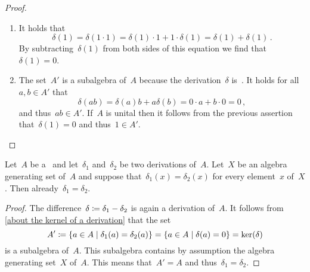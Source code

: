 \begin{proof}
  \leavevmode
  \begin{enumerate}
    \item
      It holds that
      \[
        \delta(1)
        =
        \delta(1 \cdot 1)
        =
        \delta(1) \cdot 1 + 1 \cdot \delta(1)
        =
        \delta(1) + \delta(1) \,.
      \]
      By subtracting~$\delta(1)$ from both sides of this equation we find that~$\delta(1) = 0$.
    \item
      The set~$A'$ is a subalgebra of~$A$ because the derivation~$\delta$ is~\linear{$\kf$}.
      It holds for all~$a, b \in A'$ that
      \[
        \delta(ab)
        =
        \delta(a) b + a \delta(b)
        =
        0 \cdot a + b \cdot 0
        =
        0 \,,
      \]
      and thus~$ab \in A'$.
      If~$A$ is unital then it follows from the previous assertion that~$\delta(1) = 0$ and thus~$1 \in A'$.
    \qedhere
  \end{enumerate}
\end{proof}


\begin{corollary}
  \label{dervation is uniquely determined by algebra generators}
  Let~$A$ be a~\algebra{$\kf$} and let~$\delta_1$ and~$\delta_2$ be two derivations of~$A$.
  Let~$X$ be an algebra generating set of~$A$ and suppose that~$\delta_1(x) = \delta_2(x)$ for every element~$x$ of~$X$.
  Then already~$\delta_1 = \delta_2$.
\end{corollary}


\begin{proof}
  The difference~$\delta \coloneqq \delta_1 - \delta_2$ is again a derivation of~$A$.
  It follows from \cref{about the kernel of a derivation} that the set
  \[
    A'
    \defined
    \{
      a \in A
    \suchthat
      \delta_1(a) = \delta_2(a)
    \}
    =
    \{
      a \in A
    \suchthat
      \delta(a) = 0
    \}
    =
    \ker(\delta)
  \]
  is a subalgebra of~$A$.
  This subalgebra contains by assumption the algebra generating set~$X$ of~$A$.
  This means that~$A' = A$ and thus~$\delta_1 = \delta_2$.
\end{proof}



